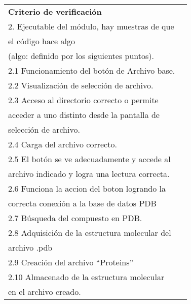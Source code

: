 \begin{longtable}{|l|l|}
\textbf{Criterio de verificación}                                                      & \begin{tabular}[c]{@{}l@{}}1. Compilación del código.\\ 2. Ejecutable del módulo, hay muestras de que \\ el código hace algo \\ (algo: definido por los siguientes puntos).\\ 2.1 Funcionamiento del botón de Archivo base.\\ 2.2 Visualización de selección de archivo.\\ 2.3 Acceso al directorio correcto o permite \\ acceder a uno distinto desde la pantalla de \\ selección de archivo.\\ 2.4 Carga del archivo correcto.\\ 2.5 El botón se ve adecuadamente y accede al \\ archivo indicado y logra una lectura correcta.\\ 2.6 Funciona la accion del boton logrando la \\ correcta conexión a la base de datos PDB\\ 2.7 Búsqueda del compuesto en PDB.\\ 2.8 Adquisición de la estructura molecular del \\ archivo .pdb\\ 2.9 Creación del archivo “Proteins”\\ 2.10 Almacenado de la estructura molecular \\ en el archivo creado.\end{tabular}                                                                                                                               \\ \hline

\end{longtable}
